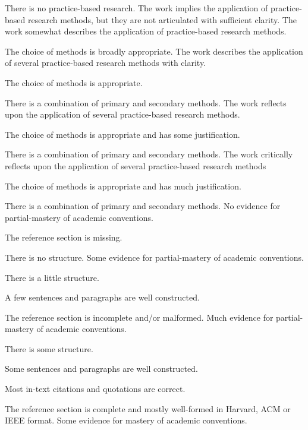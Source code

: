 \documentclass{../../fal_assignment}
\begin{document}
\begin{markingrubric}
        \grade\fail There is no practice-based research.
        \grade The work implies the application of practice-based research methods, but they are not articulated with sufficient clarity.
        \grade The work somewhat describes the application of practice-based research methods.
            \par The choice of methods is broadly appropriate.
        \grade The work describes the application of several practice-based research methods with clarity.
            \par The choice of methods is appropriate.
            \par There is a combination of primary and secondary methods.
        \grade The work reflects upon the application of several practice-based research methods.
            \par The choice of methods is appropriate and has some justification.
            \par There is a combination of primary and secondary methods.
        \grade The work critically reflects upon the application of several practice-based research methods 
            \par The choice of methods is appropriate and has much justification.
            \par There is a combination of primary and secondary methods.
%
        \grade\fail No evidence for partial-mastery of academic conventions.
        \par The reference section is missing.
        \par There is no structure.
        \grade 	Some evidence for partial-mastery of academic conventions.
            \par There is a little structure.
            \par A few sentences and paragraphs are well constructed.
            \par 	The reference section is incomplete and/or malformed.
        \grade Much evidence for partial-mastery of academic conventions.
        \par There is some structure.
            \par Some sentences and paragraphs are well constructed.
        \par Most in-text citations and quotations are correct.
        \par The reference section is complete and mostly well-formed in Harvard, ACM or IEEE format.
        \grade Some evidence for mastery of academic conventions.

\end{markingrubric}
\end{document}
